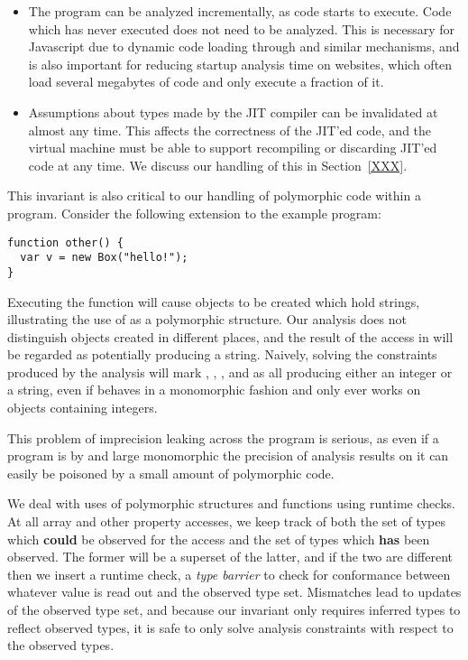 \begin{itemize}

\item The program can be analyzed incrementally, as code starts to execute.
Code which has never executed does not need to be analyzed.
This is necessary for Javascript due to dynamic code loading through
 and similar mechanisms, and is also important for reducing
startup analysis time on websites, which often load several megabytes of
code and only execute a fraction of it.

\item Assumptions about types made by the JIT compiler can be invalidated
at almost any time.
This affects the correctness of the JIT'ed code, and the virtual machine
must be able to support recompiling or discarding JIT'ed code at any time.
We discuss our handling of this in Section~\ref{XXX}.

\end{itemize}

This invariant is also critical to our handling of polymorphic code
within a program.
Consider the following extension to the example program:

\begin{lstlisting}
function other() {
  var v = new Box("hello!");
}
\end{lstlisting}

Executing the  function will cause  objects
to be created which hold strings,
illustrating the use of  as a polymorphic structure.
Our analysis does not distinguish  objects created in different
places, and the result of the  access in  will
be regarded as potentially producing a string.
Naively, solving the constraints produced by the analysis will mark
, , , and  as all producing
either an integer or a string, even if  behaves in a monomorphic
fashion and only ever works on  objects containing integers.

This problem of imprecision leaking across the program is serious, as even
if a program is by and large monomorphic the precision of analysis results on
it can easily be poisoned by a small amount of polymorphic code.

We deal with uses of polymorphic structures and functions using runtime checks.
At all array and other property accesses, we keep track of both the set of
types which {\bf could} be observed for the access and the set of types
which {\bf has} been observed.
The former will be a superset of the latter, and if the two are different then
we insert a runtime check, a {\it type barrier} to check for conformance
between whatever value is read out and the observed type set.
Mismatches lead to updates of the observed type set, and because our
invariant only requires inferred types to reflect observed types, it is
safe to only solve analysis constraints with respect to the observed types.


